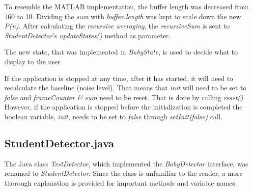 To resemble the MATLAB implementation, the buffer length was decreased from 160
to 10. Dividing the \emph{sum} with \emph{buffer.length} was kept to scale down 
the new \emph{P(n)}. After calculating the \emph{recursive averaging}, the 
\emph{recursiveSum} is sent to \emph{StudentDetector}'s \emph{updateStates()} 
method as parameter.


The new state, that was implemented in \emph{BabyState}, is used to decide
what to display to the user. 



If the application is stopped at any time, after it has started, it will need to
recalculate the baseline (noise level). That means that \emph{init} will need to
be set to \emph{false} and \emph{frameCounter \& sum} need to be reset. That is
done by calling \emph{reset()}. However, if the application is stopped before
the initialization is completed the boolean variable, \emph{init}, needs to be 
set to \emph{false} through \emph{setInit(false)} call. 




\subsection{StudentDetector.java}
The Java class \emph{TestDetector}, which implemented the \emph{BabyDetector}
interface, was renamed to \emph{StudentDetector}. Since the class is unfamiliar
to the reader, a more thorough explanation is provided for important methods and
variable names.

